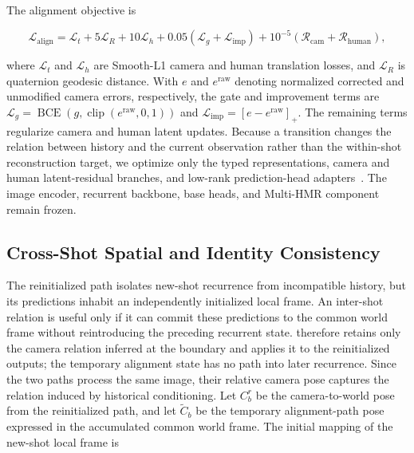 \medskip
The alignment objective is

\begin{equation}
 \mathcal L_{\mathrm{align}}=\mathcal L_t+5\mathcal L_R+10\mathcal L_h
 +0.05(\mathcal L_g+\mathcal L_{\mathrm{imp}})
 +10^{-5}(\mathcal R_{\mathrm{cam}}+\mathcal R_{\mathrm{human}}),
 \label{eq:alignment-objective}
\end{equation}

where $\mathcal L_t$ and $\mathcal L_h$ are Smooth-L1 camera and human
translation losses, and $\mathcal L_R$ is quaternion geodesic distance. With
$e$ and $e^{\mathrm{raw}}$ denoting normalized corrected and unmodified camera
errors, respectively, the gate and improvement terms are
$\mathcal L_g=\operatorname{BCE}(g,\operatorname{clip}(e^{\mathrm{raw}},0,1))$
and $\mathcal L_{\mathrm{imp}}=[e-e^{\mathrm{raw}}]_+$. The remaining terms
regularize camera and human latent updates. Because a transition changes the
relation between history and the current observation rather than the
within-shot reconstruction target, we optimize only the typed representations,
camera and human latent-residual branches, and low-rank prediction-head
adapters~\citep{hu2022lora}. The image encoder, recurrent backbone, base heads,
and Multi-HMR component~\citep{baradel2024multihmr} remain frozen.

\subsection{Cross-Shot Spatial and Identity Consistency}

The reinitialized path isolates new-shot recurrence from incompatible history,
but its predictions inhabit an independently initialized local frame. An
inter-shot relation is useful only if it can commit these predictions to the
common world frame without reintroducing the preceding recurrent state.
\method{} therefore retains only the camera relation inferred at the boundary
and applies it to the reinitialized outputs; the temporary alignment state has
no path into later recurrence. Since the two paths process the same image,
their relative camera pose captures the relation induced by historical
conditioning. Let $C_b^r$ be the camera-to-world pose from the reinitialized
path, and let $\widetilde C_b$ be the temporary alignment-path pose expressed
in the accumulated common world frame. The initial mapping of the new-shot
local frame is

